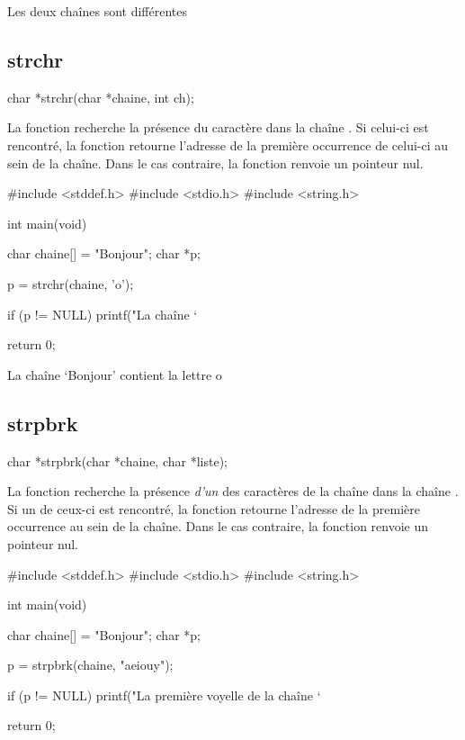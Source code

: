 \begin{C}
Les deux chaînes sont différentes
\end{C}

\subsection{strchr}
\label{strchr-1}

\begin{C}
char *strchr(char *chaine, int ch);
\end{C}

La fonction  recherche la présence du caractère
 dans la chaîne . Si celui-ci est rencontré,
la fonction retourne l'adresse de la première occurrence de celui-ci au
sein de la chaîne. Dans le cas contraire, la fonction renvoie un
pointeur nul.

\begin{C}
#include <stddef.h>
#include <stdio.h>
#include <string.h>


int main(void)
{
    char chaine[] = "Bonjour";
    char *p;

    p = strchr(chaine, 'o');

    if (p != NULL)
        printf("La chaîne `%

    return 0;
}
\end{C}

\begin{C}
La chaîne `Bonjour' contient la lettre o
\end{C}

\subsection{strpbrk}
\label{strpbrk-1}

\begin{C}
char *strpbrk(char *chaine, char *liste);
\end{C}

La fonction  recherche la présence \emph{d'un} des
caractères de la chaîne  dans la chaîne .
Si un de ceux-ci est rencontré, la fonction retourne l'adresse de la
première occurrence au sein de la chaîne. Dans le cas contraire, la
fonction renvoie un pointeur nul.

\begin{C}
#include <stddef.h>
#include <stdio.h>
#include <string.h>


int main(void)
{
    char chaine[] = "Bonjour";
    char *p;

    p = strpbrk(chaine, "aeiouy");

    if (p != NULL)
        printf("La première voyelle de la chaîne `%

    return 0;
}
\end{C}

